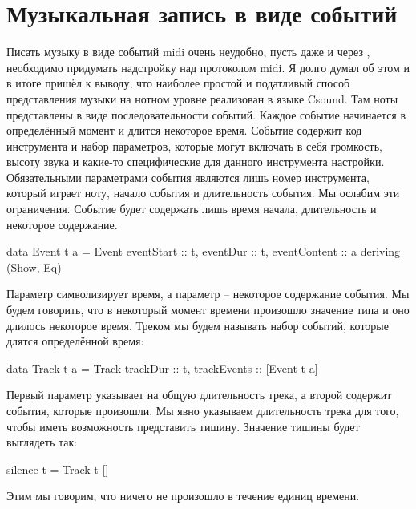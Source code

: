 \begin{code}
[(0, e1), (0, e2), (0, e3), (10, e4), (0, e5)]
\end{code}

\section{Музыкальная запись в виде событий}

Писать музыку в виде событий midi очень неудобно, пусть
даже и через , необходимо придумать надстройку
над протоколом midi. Я долго думал об этом и в итоге 
пришёл к выводу, что наиболее простой и податливый
способ представления музыки на нотном уровне реализован 
в языке Csound. Там ноты представлены в виде последовательности
событий. Каждое событие начинается в определённый момент 
и длится некоторое время. Событие содержит код инструмента 
и набор параметров, которые могут включать в себя громкость,
высоту звука и какие-то специфические для данного инструмента
настройки. Обязательными параметрами события являются лишь 
номер инструмента, который играет ноту, начало события
и длительность события. 
Мы ослабим эти ограничения. Событие будет содержать 
лишь время начала, длительность и некоторое содержание.


\begin{code}
data Event t a = Event {
    eventStart      :: t,
    eventDur        :: t,
    eventContent    :: a
    } deriving (Show, Eq)
\end{code}

Параметр  символизирует время, а параметр 
-- некоторое содержание события. Мы будем говорить, что
в некоторый момент времени произошло значение 
типа  и оно длилось некоторое время. 
Треком мы будем называть набор событий, которые
длятся определённой время:

\begin{code}
data Track t a = Track {
    trackDur        :: t,
    trackEvents     :: [Event t a] 
    } 
\end{code}

Первый параметр указывает на общую длительность трека,
а второй содержит события, которые произошли. Мы явно
указываем длительность трека для того, чтобы иметь возможность
представить тишину. Значение тишины будет выглядеть так:

\begin{code}
silence t = Track t []
\end{code}

Этим мы говорим, что ничего не произошло в течение  
единиц времени.

